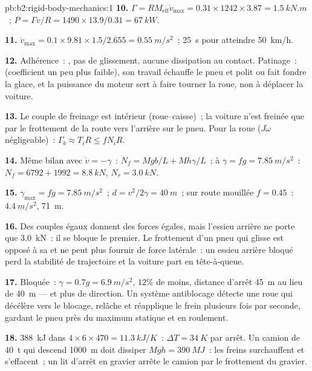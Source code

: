 \begin{solution}{pb:b2:rigid-body-mechanics:1}
\textbf{10.} $\Gamma = RM_{\text{eff}}\dot v_{\max} = 0.31 \times 1242 \times 3.87 =
\qty{1.5}{kN.m}$~; $P = \Gamma v/R = 1490 \times 13.9/0.31 = \qty{67}{kW}$.

\textbf{11.} $\dot v_{\max} = 0.1 \times 9.81 \times 1.5/2.655 = \qty{0.55}{m/s^2}$~;
\qty{25}{s} pour atteindre \qty{50}{km/h}.

\textbf{12.} Adhérence~: , pas de glissement, aucune dissipation au
contact. Patinage~:  (coefficient un peu plus faible),
son travail échauffe le pneu et polit ou fait fondre la glace, et la puissance du moteur
sert à faire tourner la roue, non à déplacer la voiture.

\textbf{13.} Le couple de freinage est intérieur (roue--caisse)~; la voiture n'est
freinée que par le frottement de la route vers l'arrière sur le pneu. Pour la roue
($J\dot\omega$ négligeable)~: $\Gamma_b \approx T_iR \le fN_iR$.

\textbf{14.} Même bilan avec $\dot v = -\gamma$~: $N_f = Mgb/L + Mh\gamma/L$~;
à $\gamma = fg = \qty{7.85}{m/s^2}$~: $N_f = 6792 + 1992 = \qty{8.8}{kN}$, $N_r =
\qty{3.0}{kN}$.

\textbf{15.} $\gamma_{\max} = fg = \qty{7.85}{m/s^2}$~; $d = v^2/2\gamma = \qty{40}{m}$~;
sur route mouillée $f = 0.45$~: $\qty{4.4}{m/s^2}$, \qty{71}{m}.

\textbf{16.} Des couples égaux donnent des forces égales, mais l'essieu arrière ne porte
que \qty{3.0}{kN}~: il se bloque le premier. Le frottement d'un pneu qui glisse est opposé
à sa  et ne peut plus fournir de force latérale~: un essieu
arrière bloqué perd la stabilité de trajectoire et la voiture part en tête-à-queue.

\textbf{17.} Bloquée~: $\gamma = 0.7g = \qty{6.9}{m/s^2}$, $12\%$ de moins, distance
d'arrêt \qty{45}{m} au lieu de \qty{40}{m} --- et plus de direction. Un système
antiblocage détecte une roue qui décélère vers le blocage, relâche et
réapplique le frein plusieurs fois par seconde, gardant le pneu près du
maximum statique et en roulement.

\textbf{18.} \qty{388}{kJ} dans $4 \times 6 \times 470 = \qty{11.3}{kJ/K}$~: $\Delta T =
\qty{34}{K}$ par arrêt. Un camion de \qty{40}{t} qui descend \qty{1000}{m} doit dissiper
$Mgh = \qty{390}{MJ}$~: les freins surchauffent et s'effacent~; un lit d'arrêt en gravier arrête le
camion par le frottement du gravier.


\end{solution}
